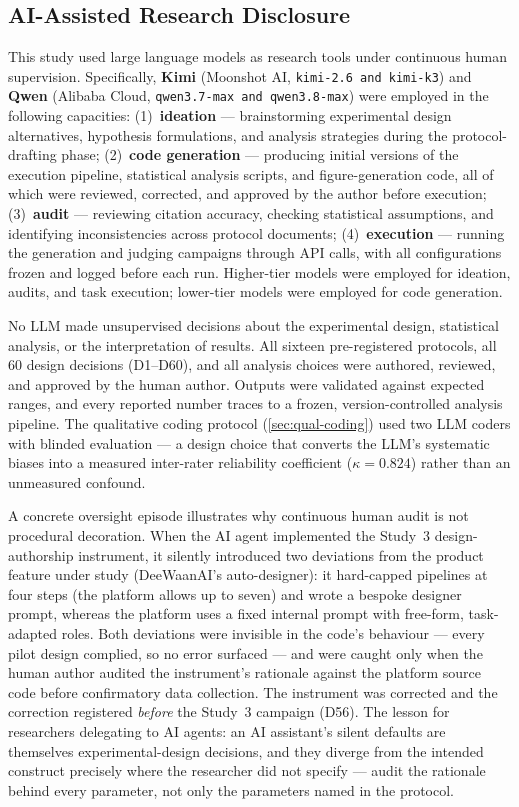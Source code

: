 \documentclass[12pt,a4paper]{article}
\begin{document}
\subsection{AI-Assisted Research Disclosure}\label{sec:ai-disclosure}

This study used large language models as research tools under continuous human
supervision. Specifically, \textbf{Kimi} (Moonshot AI, \texttt{kimi-2.6 and kimi-k3}) and
\textbf{Qwen} (Alibaba Cloud, \texttt{qwen3.7-max and qwen3.8-max}) were employed in the
following capacities: (1)~\textbf{ideation} --- brainstorming experimental
design alternatives, hypothesis formulations, and analysis strategies during the
protocol-drafting phase; (2)~\textbf{code generation} --- producing initial
versions of the execution pipeline, statistical analysis scripts, and
figure-generation code, all of which were reviewed, corrected, and approved by
the author before execution; (3)~\textbf{audit} --- reviewing citation accuracy,
checking statistical assumptions, and identifying inconsistencies across
protocol documents; (4)~\textbf{execution} --- running the generation and
judging campaigns through API calls, with all configurations frozen and logged
before each run. Higher-tier models were employed for ideation, audits, and
task execution; lower-tier models were employed for code generation.

No LLM made unsupervised decisions about the experimental design, statistical
analysis, or the interpretation of results. All sixteen pre-registered protocols,
all 60 design decisions (D1--D60), and all analysis choices were authored,
reviewed, and approved by the human author. Outputs were
validated against expected ranges, and every reported number traces to a frozen,
version-controlled analysis pipeline. The qualitative coding protocol
(\cref{sec:qual-coding}) used two LLM coders with blinded evaluation --- a
design choice that converts the LLM's systematic biases into a measured
inter-rater reliability coefficient ($\kappa = 0.824$) rather than an unmeasured
confound.

A concrete oversight episode illustrates why continuous human audit is not
procedural decoration. When the AI agent implemented the Study~3
design-authorship instrument, it silently introduced two deviations from the
product feature under study (DeeWaanAI's auto-designer): it hard-capped
pipelines at four steps (the platform allows up to seven) and wrote a bespoke
designer prompt, whereas the platform uses a fixed internal prompt with
free-form, task-adapted roles. Both deviations were invisible in the code's
behaviour --- every pilot design complied, so no error surfaced --- and were
caught only when the human author audited the instrument's rationale against
the platform source code before confirmatory data collection. The instrument
was corrected and the correction registered \emph{before} the Study~3
campaign (D56). The lesson for researchers delegating to AI agents: an AI
assistant's silent defaults are themselves experimental-design decisions, and
they diverge from the intended construct precisely where the researcher did
not specify --- audit the rationale behind every parameter, not only the
parameters named in the protocol.
\end{document}
